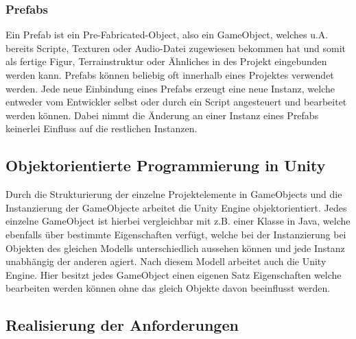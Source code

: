 \documentclass[
	12pt, %
	a4paper,
	listof=totoc, %
	bibliography=totoc, %
	numbers=noenddot, %
	ngerman, %
	headsepline, %
	oneside %
	]{scrbook} %
\begin{document}
{\subsubsection{Prefabs}
Ein Prefab ist ein Pre-Fabricated-Object, also ein GameObject, welches u.A. bereits Scripte, Texturen oder Audio-Datei zugewiesen bekommen hat und somit als fertige Figur, Terrainstruktur oder Ähnliches in des Projekt eingebunden werden kann. Prefabs können beliebig oft innerhalb eines Projektes verwendet werden. Jede neue Einbindung eines Prefabs erzeugt eine neue Instanz, welche entweder vom Entwickler selbst oder durch ein Script angesteuert und bearbeitet werden können. Dabei nimmt die Änderung an einer Instanz eines Prefabs keinerlei Einfluss auf die restlichen Instanzen.

\subsection{Objektorientierte Programmierung in Unity}
Durch die Strukturierung der einzelne Projektelemente in GameObjects und die Instanzierung der GameObjecte arbeitet die Unity Engine objektorientiert. Jedes einzelne GameObject ist hierbei vergleichbar mit z.B. einer Klasse in Java, welche ebenfalls über bestimmte Eigenschaften verfügt, welche bei der Instanzierung bei Objekten des gleichen Modells unterschiedlich aussehen können und jede Instanz unabhängig der anderen agiert. Nach diesem Modell arbeitet auch die Unity Engine. Hier besitzt jedes GameObject einen eigenen Satz Eigenschaften welche bearbeiten werden können ohne das gleich Objekte davon beeinflusst werden.

\subsection{Realisierung der Anforderungen}
}
\end{document}
